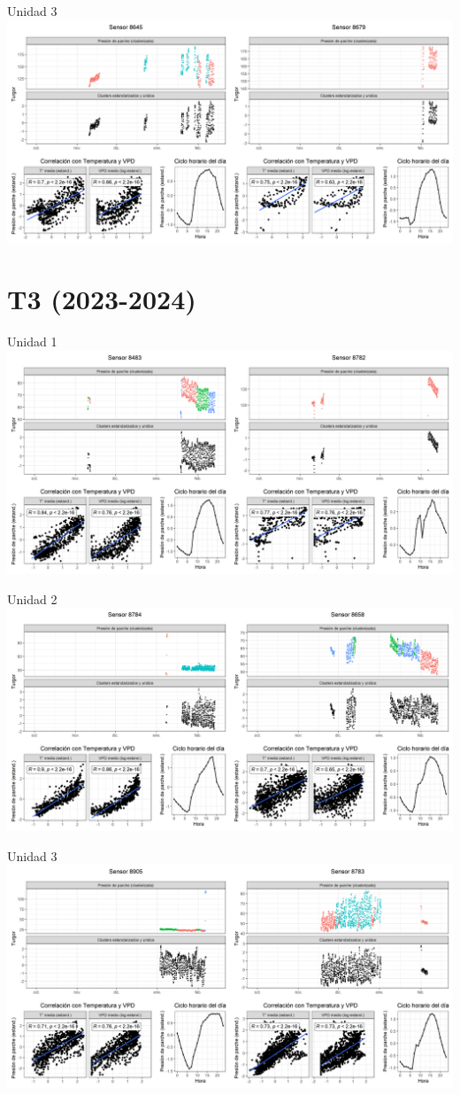 \documentclass[
  letterpaper,
  DIV=11,
  numbers=noendperiod]{scrreprt}
\begin{document}
Unidad 3
\includegraphics{figuras/03_turgor_union/2023_2024_Rio_Claro_T2_Unidad_3.png}

\chapter{T3 (2023-2024)}

Unidad 1
\includegraphics{figuras/03_turgor_union/2023_2024_Rio_Claro_T3_Unidad_1.png}

Unidad 2
\includegraphics{figuras/03_turgor_union/2023_2024_Rio_Claro_T3_Unidad_2.png}

Unidad 3
\includegraphics{figuras/03_turgor_union/2023_2024_Rio_Claro_T3_Unidad_3.png}
\end{document}
